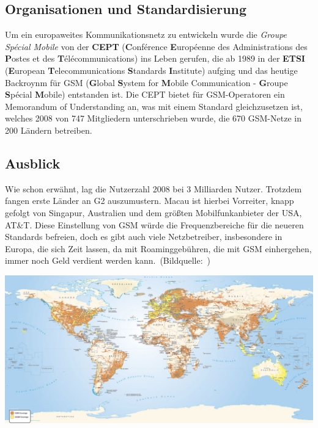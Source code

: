 \begin{multicols}{3}
\subsection*{Organisationen und Standardisierung}
Um ein europaweites Kommunikationsnetz zu entwickeln wurde die \textit{Groupe Spécial Mobile} von der \textbf{CEPT} (\textbf{C}onférence \textbf{E}uropéenne des Administrations des \textbf{P}ostes et des \textbf{T}élécommunications) ins Leben gerufen, die ab 1989 in der \textbf{ETSI} (\textbf{E}uropean \textbf{T}elecommunications \textbf{S}tandards \textbf{I}nstitute) aufging und das heutige Backroynm für GSM (\textbf{G}lobal \textbf{S}ystem for \textbf{M}obile Communication - \textbf{G}roupe \textbf{S}pécial \textbf{M}obile) entstanden ist. Die CEPT bietet für GSM-Operatoren ein Memorandum of Understanding an, was mit einem Standard gleichzusetzen ist, welches 2008 von 747 Mitgliedern unterschrieben wurde, die 670 GSM-Netze in 200 Ländern betreiben. \cite{G2.3}	
\subsection*{Ausblick}
Wie schon erwähnt, lag die Nutzerzahl 2008 bei 3 Milliarden Nutzer. Trotzdem fangen erste Länder an G2 auszumustern. Macau ist hierbei Vorreiter, knapp gefolgt von Singapur, Australien und dem größten Mobilfunkanbieter der USA, AT\&T.
Diese Einstellung von GSM würde die Frequenzbereiche für die neueren Standards befreien, doch es gibt auch viele Netzbetreiber, insbesondere in Europa, die sich Zeit lassen, da mit Roaminggebühren, die mit GSM einhergehen, immer noch Geld verdient werden kann.\cite{G2.3}~(Bildquelle:~\cite{G2.4})
\printbibliography[segment=7,heading=subbibliography]
\end{multicols}
\begin{Figure}
\includegraphics[width=\textwidth]{Kapitel/2G/Grafiken/GSM-Netzabdeckung-Weltweit.jpg}
\label{fig:G2.global}
\end{Figure}
\newpage
